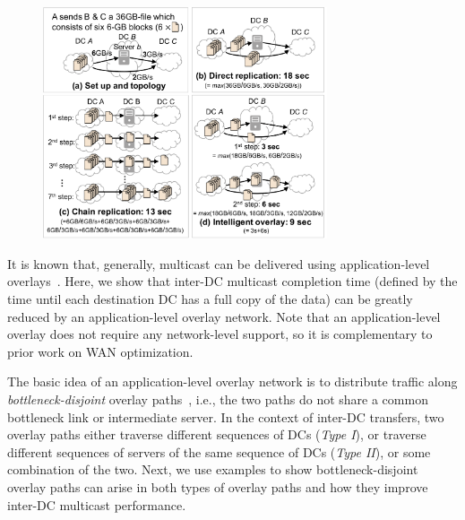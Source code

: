 \begin{figure}[t]
\centering
\includegraphics[width=84mm]{images/example-2.pdf}
\label{fig:case:example}
\end{figure}

It is known that, generally, multicast can be delivered using application-level
overlays~\cite{chu2000case}. Here, we show that inter-DC multicast
completion time (defined by the time until each destination DC has
a full copy of the data) can be greatly reduced by an
application-level overlay network. Note that an application-level
overlay does not require any network-level support, so it is
complementary to prior work on WAN optimization.

The basic idea of an application-level overlay network is to
distribute traffic along {\em bottleneck-disjoint} overlay
paths~\cite{datta19951}, i.e., the two paths do not share a common
bottleneck link or intermediate server.
In the context of inter-DC transfers, two overlay paths either
traverse different sequences of DCs ({\em Type I}), or
traverse different sequences of servers of the same sequence of
DCs ({\em Type II}), or some combination of the two.
Next, we use examples to show bottleneck-disjoint overlay paths can
arise in both types of overlay paths and how they improve inter-DC
multicast performance.

